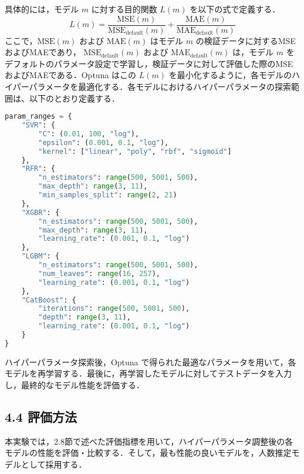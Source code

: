 具体的には，モデル \( m \) に対する目的関数 \( L(m) \) を以下の式で定義する．
\begin{equation}
L(m) = \frac{\mathrm{MSE}(m)}{\mathrm{MSE}_{\mathrm{default}}(m)} + \frac{\mathrm{MAE}(m)}{\mathrm{MAE}_{\mathrm{default}}(m)}
\end{equation}
ここで，\( \mathrm{MSE}(m) \) および \( \mathrm{MAE}(m) \) はモデル \( m \) の検証データに対するMSEおよびMAEであり，  
\( \mathrm{MSE}_{\mathrm{default}}(m) \) および \( \mathrm{MAE}_{\mathrm{default}}(m) \) は，モデル \( m \) をデフォルトのパラメータ設定で学習し，検証データに対して評価した際のMSEおよびMAEである．Optuna はこの \( L(m) \) を最小化するように，各モデルのハイパーパラメータを最適化する．各モデルにおけるハイパーパラメータの探索範囲は、以下のとおり定義する．
\begin{lstlisting}[style=mystyle, language=Python, caption=各モデルのハイパーパラメータ探索範囲]
param_ranges = {
    "SVR": {
        "C": (0.01, 100, "log"),
        "epsilon": (0.001, 0.1, "log"),
        "kernel": ["linear", "poly", "rbf", "sigmoid"]
    },
    "RFR": {
        "n_estimators": range(500, 5001, 500),
        "max_depth": range(3, 11),
        "min_samples_split": range(2, 21)
    },
    "XGBR": {
        "n_estimators": range(500, 5001, 500),
        "max_depth": range(3, 11),
        "learning_rate": (0.001, 0.1, "log")
    },
    "LGBM": {
        "n_estimators": range(500, 5001, 500),
        "num_leaves": range(16, 257),
        "learning_rate": (0.001, 0.1, "log")
    },
    "CatBoost": {
        "iterations": range(500, 5001, 500),
        "depth": range(3, 11),
        "learning_rate": (0.001, 0.1, "log")
    }
}
\end{lstlisting}
ハイパーパラメータ探索後，Optuna で得られた最適なパラメータを用いて，各モデルを再学習する．最後に，再学習したモデルに対してテストデータを入力し，最終的なモデル性能を評価する．

\subsection*{4.4 評価方法}
本実験では，2.8節で述べた評価指標を用いて，ハイパーパラメータ調整後の各モデルの性能を評価・比較する．そして，最も性能の良いモデルを，人数推定モデルとして採用する．

